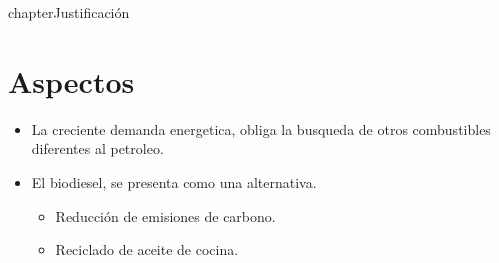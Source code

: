 chapter{Justificación}
\section{Aspectos}

\begin{itemize}
    \item La creciente demanda energetica, obliga la busqueda de otros combustibles diferentes al petroleo.
    \item El biodiesel, se presenta como una alternativa.
    \begin{itemize}
        \item Reducción de emisiones de carbono.
        \item Reciclado de aceite de cocina.
    \end{itemize}
\end{itemize}
